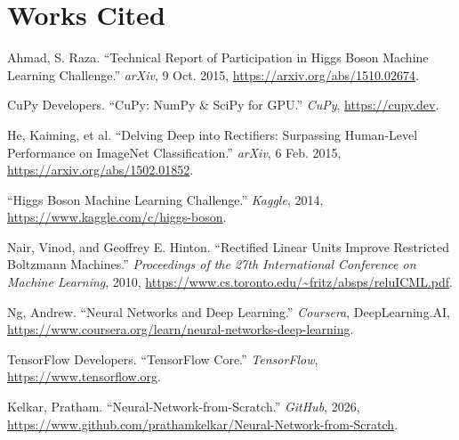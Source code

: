 \documentclass{article}
\begin{document}
\section{Works Cited}
\noindent\hangindent=0.5in
Ahmad, S. Raza. ``Technical Report of Participation in Higgs Boson Machine Learning Challenge.'' \textit{arXiv}, 9 Oct. 2015, \url{https://arxiv.org/abs/1510.02674}.
\par\bigskip
\noindent\hangindent=0.5in
CuPy Developers. ``CuPy: NumPy \& SciPy for GPU.'' \textit{CuPy}, \url{https://cupy.dev}.
\par\bigskip
\noindent\hangindent=0.5in
He, Kaiming, et al. ``Delving Deep into Rectifiers: Surpassing Human-Level Performance on ImageNet Classification.'' \textit{arXiv}, 6 Feb. 2015, \url{https://arxiv.org/abs/1502.01852}.
\par\bigskip
\noindent\hangindent=0.5in
``Higgs Boson Machine Learning Challenge.'' \textit{Kaggle}, 2014, \url{https://www.kaggle.com/c/higgs-boson}.
\par\bigskip
\noindent\hangindent=0.5in
Nair, Vinod, and Geoffrey E. Hinton. ``Rectified Linear Units Improve Restricted Boltzmann Machines.'' \textit{Proceedings of the 27th International Conference on Machine Learning}, 2010, \url{https://www.cs.toronto.edu/~fritz/absps/reluICML.pdf}.
\par\bigskip
\noindent\hangindent=0.5in
Ng, Andrew. ``Neural Networks and Deep Learning.'' \textit{Coursera}, DeepLearning.AI, \url{https://www.coursera.org/learn/neural-networks-deep-learning}.
\par\bigskip
\noindent\hangindent=0.5in
TensorFlow Developers. ``TensorFlow Core.'' \textit{TensorFlow}, \url{https://www.tensorflow.org}.
\par\bigskip
\noindent\hangindent=0.5in
Kelkar, Pratham. ``Neural-Network-from-Scratch.'' \textit{GitHub}, 2026, \url{https://www.github.com/prathamkelkar/Neural-Network-from-Scratch}.

\pagebreak
\end{document}

